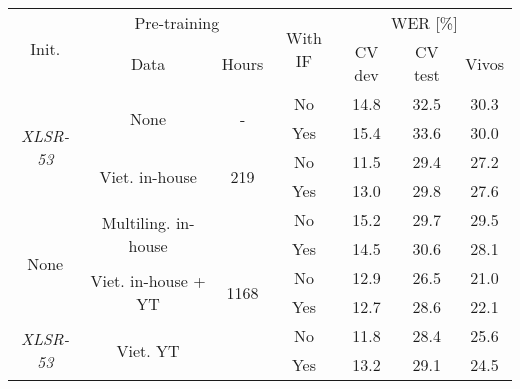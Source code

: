 \begin{table}[!ht]
\captionsetup{font=large}
\centering
\begin{adjustbox}{width=0.63\columnwidth,center}
\begin{tabular}{|c|c|c|c|c|c|c|} 
\hline
\multirow{2}{*}{Init.}            & \multicolumn{2}{c|}{Pre-training}                            & \multirow{2}{*}{With IF} & \multicolumn{3}{c|}{WER [\%]}  \\ 
\cline{2-3}\cline{5-7}
                                  & Data                                 & Hours                 &                          & CV dev & CV test & Vivos       \\ 
\hline
\multirow{4}{*}{\textit{XLSR-53}} & \multirow{2}{*}{None}                & \multirow{2}{*}{-}    & No                       & 14.8   & 32.5    & 30.3        \\ 
\cline{4-7}
                                  &                                      &                       & Yes                      & 15.4   & 33.6    & 30.0        \\ 
\cline{2-7}
                                  & \multirow{2}{*}{Viet. in-house}      & \multirow{2}{*}{219}  & No                       & 11.5   & 29.4    & 27.2        \\ 
\cline{4-7}
                                  &                                      &                       & Yes                      & 13.0   & 29.8    & 27.6        \\ 
\hline
\multirow{4}{*}{None}             & \multirow{2}{*}{Multiling. in-house} & \multirow{6}{*}{1168} & No                       & 15.2   & 29.7    & 29.5        \\ 
\cline{4-7}
                                  &                                      &                       & Yes                      & 14.5   & 30.6    & 28.1        \\ 
\cline{2-2}\cline{4-7}
                                  & \multirow{2}{*}{Viet. in-house + YT} &                       & No                       & 12.9   & 26.5    & 21.0        \\ 
\cline{4-7}
                                  &                                      &                       & Yes                      & 12.7   & 28.6    & 22.1        \\ 
\cline{1-2}\cline{4-7}
\multirow{2}{*}{\textit{XLSR-53}} & \multirow{2}{*}{Viet. YT}            &                       & No                       & 11.8   & 28.4    & 25.6        \\ 
\cline{4-7}
                                  &                                      &                       & Yes                      & 13.2   & 29.1    & 24.5        \\
\hline
\end{tabular}
\end{adjustbox}
\caption{
    }
\label{table:if_loss_cvvivos_neg}
\end{table}
